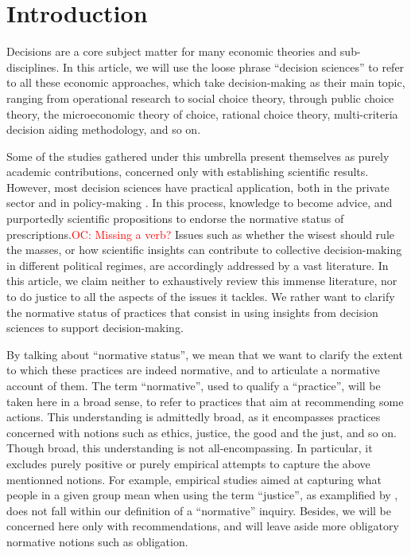 \documentclass[preprint, french, english, 11pt, authoryear]{elsarticle}%
\newcommand{\commentOC}[1]{\textcolor{red}{OC: #1}}
\begin{document}
\section{Introduction}
Decisions are a core subject matter for many economic theories and sub-disciplines. In this article, we will use the loose phrase ``decision sciences'' to refer to all these economic approaches, which take decision-making as their main topic, ranging from operational research to social choice theory, through public choice theory, the microeconomic theory of choice, rational choice theory, multi-criteria decision aiding methodology, and so on.

Some of the studies gathered under this umbrella present themselves as purely academic contributions, concerned only with establishing scientific results. However, most decision sciences have practical application, both in the private sector and in policy-making \citet{tsoukias_policy_2013,marchi_evidence-based_2016}. In this process, knowledge to become advice, and purportedly scientific propositions to endorse the normative status of prescriptions.\commentOC{Missing a verb?} 
Issues such as whether the wisest should rule the masses, or how scientific insights can contribute to collective decision-making in different political regimes, are accordingly addressed by a vast literature. In this article, we claim neither to exhaustively review this immense literature, nor to do justice to all the aspects of the issues it tackles. We rather want to clarify the normative status of practices that consist in using insights from decision sciences to support decision-making.

By talking about ``normative status'', we mean that we want to clarify the extent to which these practices are indeed normative, and to articulate a normative account of them. 
The term ``normative'', used to qualify a “practice”, will be taken here in a broad sense, to refer to practices that aim at recommending some actions. This understanding is admittedly broad, as it encompasses practices concerned with notions such as ethics, justice, the good and the just, and so on. 
Though broad, this understanding is not all-encompassing. In particular, it excludes purely positive or purely empirical attempts to capture the above mentionned notions. For example, empirical studies aimed at capturing what people in a given group mean when using the term ``justice'', as examplified by \citet{gaertner_empirical_2012}, does not fall within our definition of a ``normative'' inquiry. Besides, we will be concerned here only with recommendations, and will leave aside more obligatory normative notions such as obligation.
\end{document}
